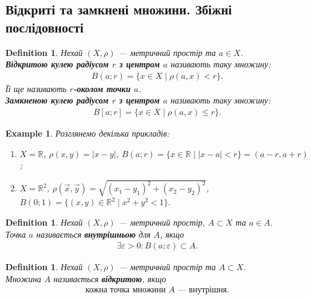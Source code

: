 \documentclass[a4paper, 10pt]{article}
\theoremstyle{theoremdd}
\theoremstyle{theoremdd}
\newtheorem{definition}[theorem]{Definition}
\theoremstyle{theoremdd}
\theoremstyle{theoremdd}
\newtheorem{example}[theorem]{Example}
\theoremstyle{theoremdd}
\theoremstyle{theoremdd}
\theoremstyle{theoremdd}
\theoremstyle{theoremdd}
\begin{document}
\subsection{Відкриті та замкнені множини. Збіжні послідовності}
\begin{definition}
Нехай $(X,\rho)$ --- метричний простір та $a \in X$.\\
\textbf{Відкритою кулею радіусом $r$ з центром $a$} називають таку множину:
\begin{align*}
B(a;r) = \{x \in X \mid \rho(a,x) < r\}.
\end{align*}
Її ще називають \textbf{$r$-околом точки $a$}.\\
\textbf{Замкненою кулею радіусом $r$ з центром $a$} називають таку множину:
\begin{align*}
B[a;r] = \{x \in X \mid \rho(a,x) \leq r \}.
\end{align*}
\end{definition}

\begin{example}
Розглянемо декілька прикладів:
\begin{enumerate}[nosep,wide=0pt,label={\arabic*)}]
\item $X = \mathbb{R}$, $\rho(x,y) = |x-y|$, \qquad $B(a;r) = \{x \in \mathbb{R} \mid |x-a| < r\} = (a-r,a+r)$;
\item $X = \mathbb{R}^2$, $\rho(\vec{x}, \vec{y}) = \sqrt{(x_1-y_1)^2 + (x_2-y_2)^2}$, \qquad $B(0;1) = \{(x,y) \in \mathbb{R}^2 \mid x^2+y^2 <1 \}$.
\end{enumerate}
\end{example}

\begin{definition}
Нехай $(X,\rho)$ --- метричний простір, $A \subset X$ та $a \in A$.\\
Точка $a$ називається \textbf{внутрішньою} для $A$, якщо
\begin{align*}
\exists \varepsilon > 0: B(a; \varepsilon) \subset A.
\end{align*}
\end{definition}

\begin{definition}
Нехай $(X,\rho)$ --- метричний простір та $A \subset X$.\\
Множина $A$ називається \textbf{відкритою}, якщо
\begin{align*}
\text{кожна точка множини $A$ --- внутрішня.}
\end{align*}
\end{definition}
\end{document}
